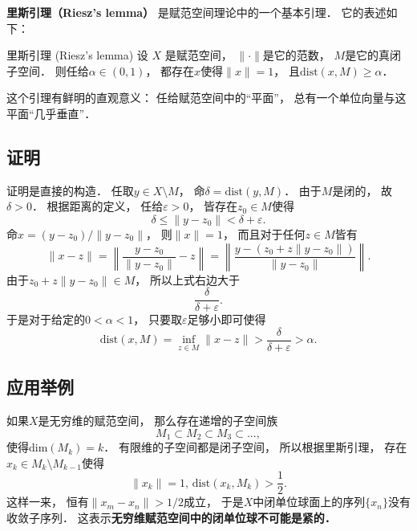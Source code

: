 
\begin{issues}
\issueNeedCite
\end{issues}


\textbf{里斯引理（Riesz's lemma）} 是赋范空间理论中的一个基本引理． 它的表述如下：

\begin{lemma}{里斯引理 (Riesz's lemma)}
设 $X$ 是赋范空间， $\|\cdot\|$是它的范数， $M$是它的真闭子空间． 则任给$\alpha\in(0,1)$， 都存在$x$使得$\|x\|=1$， 且$\text{dist}(x,M)\geq\alpha$．
\end{lemma}

这个引理有鲜明的直观意义： 任给赋范空间中的“平面”， 总有一个单位向量与这平面“几乎垂直”．

\subsection{证明}
证明是直接的构造． 任取$y\in X\setminus M$， 命$\delta=\text{dist}(y,M)$． 由于$M$是闭的， 故$\delta>0$． 根据距离的定义， 任给$\varepsilon>0$， 皆存在$z_0\in M$使得
$$
\delta\leq \|y-z_0\|<\delta+\varepsilon.
$$
命$x=(y-z_0)/\|y-z_0\|$， 则$\|x\|=1$， 而且对于任何$z\in M$皆有
$$
\|x-z\|
=\left\|\frac{y-z_0}{\|y-z_0\|}-z\right\|
=\left\|\frac{y-(z_0+z\|y-z_0\|)}{\|y-z_0\|}\right\|.
$$
由于$z_0+z\|y-z_0\|\in M$， 所以上式右边大于
$$
\frac{\delta}{\delta+\varepsilon}.
$$
于是对于给定的$0<\alpha<1$， 只要取$\varepsilon$足够小即可使得
$$
\text{dist}(x,M)
=\inf_{z\in M}\|x-z\|
>\frac{\delta}{\delta+\varepsilon}
>\alpha.
$$

\subsection{应用举例}
如果$X$是无穷维的赋范空间， 那么存在递增的子空间族
$$
M_1\subset M_2\subset M_3\subset...,
$$
使得$\text{dim}(M_k)=k$． 有限维的子空间都是闭子空间， 所以根据里斯引理， 存在$x_k\in M_k\setminus M_{k-1}$使得
$$
\|x_k\|=1,\,\text{dist}(x_k,M_k)>\frac{1}{2}.
$$
这样一来， 恒有$\|x_m-x_n\|>1/2$成立， 于是$X$中闭单位球面上的序列$\{x_n\}$没有收敛子序列． 这表示\textbf{无穷维赋范空间中的闭单位球不可能是紧的．}
